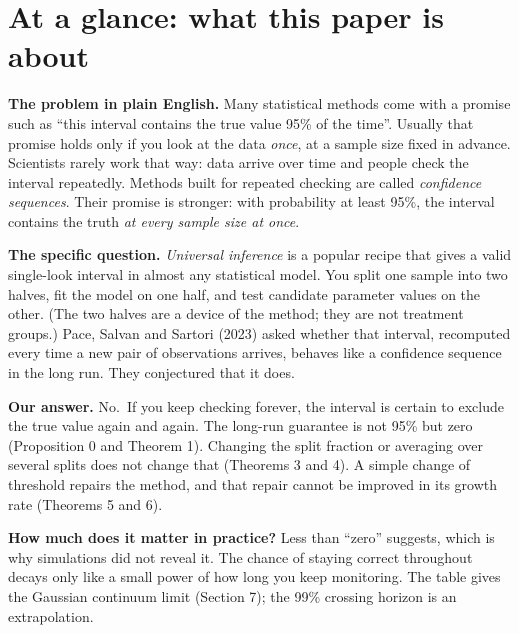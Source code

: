 \documentclass[
  10pt,
  a4paper,
]{article}
\begin{document}
\section{At a glance: what this paper is
about}\label{at-a-glance-what-this-paper-is-about}

\textbf{The problem in plain English.} Many statistical methods come
with a promise such as ``this interval contains the true value 95\% of
the time''. Usually that promise holds only if you look at the data
\emph{once}, at a sample size fixed in advance. Scientists rarely work
that way: data arrive over time and people check the interval
repeatedly. Methods built for repeated checking are called
\emph{confidence sequences}. Their promise is stronger: with probability
at least 95\%, the interval contains the truth \emph{at every sample
size at once}.

\textbf{The specific question.} \emph{Universal inference} is a popular
recipe that gives a valid single-look interval in almost any statistical
model. You split one sample into two halves, fit the model on one half,
and test candidate parameter values on the other. (The two halves are a
device of the method; they are not treatment groups.) Pace, Salvan and
Sartori (2023) asked whether that interval, recomputed every time a new
pair of observations arrives, behaves like a confidence sequence in the
long run. They conjectured that it does.

\textbf{Our answer.} No.~If you keep checking forever, the interval is
certain to exclude the true value again and again. The long-run
guarantee is not 95\% but zero (Proposition 0 and Theorem 1). Changing
the split fraction or averaging over several splits does not change that
(Theorems 3 and 4). A simple change of threshold repairs the method, and
that repair cannot be improved in its growth rate (Theorems 5 and 6).

\textbf{How much does it matter in practice?} Less than ``zero''
suggests, which is why simulations did not reveal it. The chance of
staying correct throughout decays only like a small power of how long
you keep monitoring. The table gives the Gaussian continuum limit
(Section 7); the 99\% crossing horizon is an extrapolation.
\end{document}
